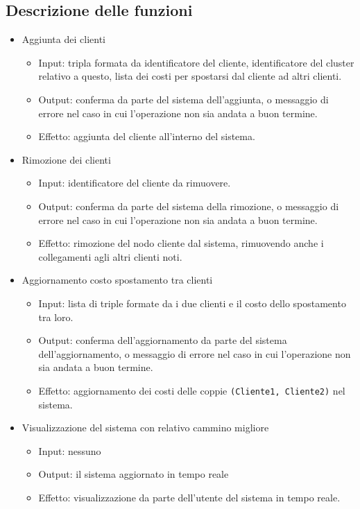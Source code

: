 \subsection{Descrizione delle funzioni}
\begin{itemize}
    \item Aggiunta dei clienti
        \begin{itemize}
            \item Input: tripla formata da identificatore del cliente, identificatore del cluster relativo a questo, lista dei costi per spostarsi dal cliente ad altri clienti.
            \item Output: conferma da parte del sistema dell'aggiunta, o messaggio di errore nel caso in cui l'operazione non sia andata a buon termine.
            \item Effetto: aggiunta del cliente all'interno del sistema.
        \end{itemize}
    \item Rimozione dei clienti
        \begin{itemize}
            \item Input: identificatore del cliente da rimuovere.
            \item Output: conferma da parte del sistema della rimozione, o messaggio di errore nel caso in cui l'operazione non sia andata a buon termine.
            \item Effetto: rimozione del nodo cliente dal sistema, rimuovendo anche i collegamenti agli altri clienti noti.
        \end{itemize}
    \item Aggiornamento costo spostamento tra clienti
        \begin{itemize}
            \item Input: lista di triple formate da i due clienti e il costo dello spostamento tra loro.
            \item Output: conferma dell'aggiornamento da parte del sistema dell'aggiornamento, o messaggio di errore nel caso in cui l'operazione non sia andata a buon termine.
            \item Effetto: aggiornamento dei costi delle coppie \texttt{(Cliente1, Cliente2)} nel sistema.
        \end{itemize}
    \item Visualizzazione del sistema con relativo cammino migliore
        \begin{itemize}
            \item Input: nessuno
            \item Output: il sistema aggiornato in tempo reale
            \item Effetto: visualizzazione da parte dell'utente del sistema in tempo reale.
        \end{itemize}
\end{itemize}

